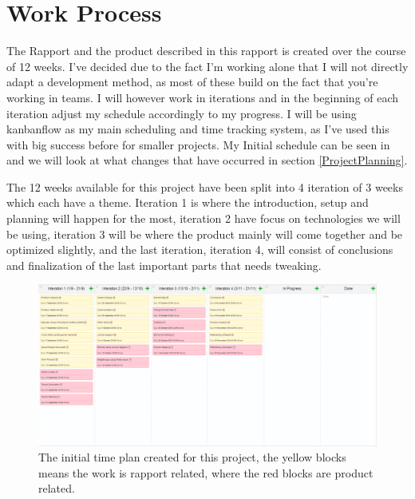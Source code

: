 \section{Work Process}

The Rapport and the product described in this rapport is created over the course of 12 weeks. I've decided due to the fact I'm working alone that I will not directly adapt a development method, as most of these build on the fact that you're working in teams. I will however work in iterations and in the beginning of each iteration adjust my schedule accordingly to my progress. I will be using kanbanflow as my main scheduling and time tracking system, as I've used this with big success before for smaller projects. My Initial schedule can be seen in  and we will look at what changes that have occurred in section \ref{ProjectPlanning}.

The 12 weeks available for this project have been split into 4 iteration of 3 weeks which each have a theme. Iteration 1 is where the introduction, setup and planning will happen for the most, iteration 2 have focus on technologies we will be using, iteration 3 will be where the product mainly will come together and be optimized slightly, and the last iteration, iteration 4, will consist of conclusions and finalization of the last important parts that needs tweaking.


\begin{figure}[H]
	\includegraphics[width=1\linewidth]{img/InitTimeplan}
	\centering
	\caption{The initial time plan created for this project, the yellow blocks means the work is rapport related, where the red blocks are product related.}
	\label{fig:InitTimeplan}
\end{figure}
